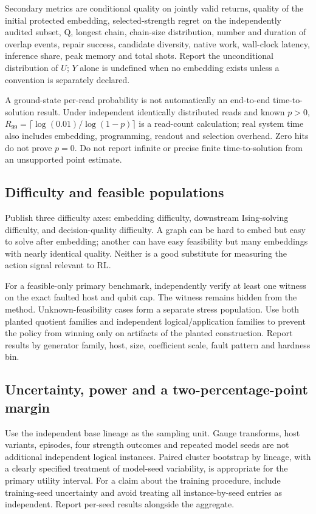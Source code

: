 Secondary metrics are conditional quality on jointly valid returns, quality of the initial protected embedding, selected-strength regret on the independently audited subset, Q, longest chain, chain-size distribution, number and duration of overlap events, repair success, candidate diversity, native work, wall-clock latency, inference share, peak memory and total shots. Report the unconditional distribution of $U$; $Y$ alone is undefined when no embedding exists unless a convention is separately declared.

A ground-state per-read probability is not automatically an end-to-end time-to-solution result. Under independent identically distributed reads and known $p>0$, $R_{99}=\lceil\log(0.01)/\log(1-p)\rceil$ is a read-count calculation; real system time also includes embedding, programming, readout and selection overhead. Zero hits do not prove $p=0$. Do not report infinite or precise finite time-to-solution from an unsupported point estimate.

\subsection{Difficulty and feasible populations}
Publish three difficulty axes: embedding difficulty, downstream Ising-solving difficulty, and decision-quality difficulty. A graph can be hard to embed but easy to solve after embedding; another can have easy feasibility but many embeddings with nearly identical quality. Neither is a good substitute for measuring the action signal relevant to RL.

For a feasible-only primary benchmark, independently verify at least one witness on the exact faulted host and qubit cap. The witness remains hidden from the method. Unknown-feasibility cases form a separate stress population. Use both planted quotient families and independent logical/application families to prevent the policy from winning only on artifacts of the planted construction. Report results by generator family, host, size, coefficient scale, fault pattern and hardness bin.

\subsection{Uncertainty, power and a two-percentage-point margin}
Use the independent base lineage as the sampling unit. Gauge transforms, host variants, episodes, four strength outcomes and repeated model seeds are not additional independent logical instances. Paired cluster bootstrap by lineage, with a clearly specified treatment of model-seed variability, is appropriate for the primary utility interval. For a claim about the training procedure, include training-seed uncertainty and avoid treating all instance-by-seed entries as independent. Report per-seed results alongside the aggregate.

